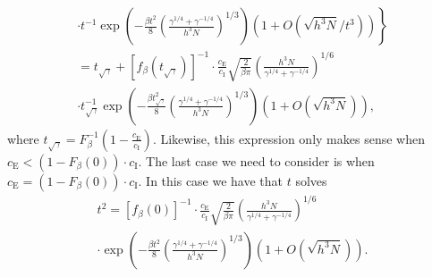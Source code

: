\documentclass[final]{IEEEtran}
\newcommand{\ce}{c_\text{E}}
\newcommand{\ci}{c_\text{I}}
\begin{document}
\begin{IEEEproof}
\begin{multline*}
    \cdot
    \left . t^{-1}
           \exp \!
           \left(
               -\frac{\beta t^2}{8}
               \left(
                   \frac{\gamma^{1/4} + \gamma^{-1/4}}{ h^3 N }
               \right)^{\!1/3}
           \right) \!
           \left(
               1 + O\left(\sqrt{h^3 N}/t^3 \right)
           \right) \!
       \right\}
    \\ \!\!\!
    = t_{\sqrt{\gamma}}
       +
       \left[
           f_\beta \left( t_{\sqrt{\gamma}} \right)
       \right]^{-1}
       \cdot
       \frac{\ce}{\ci}
       \sqrt{\frac{2}{\beta \pi}}
       \left(
           \frac{ h^3 N }{\gamma^{1/4} + \gamma^{-1/4}}
       \right)^{1/6}
    \\
    \cdot t_{\sqrt{\gamma}}^{-1}
       \exp
       \left(
           -\frac{\beta t_{\sqrt{\gamma}}^2}{8}
           \left(
               \frac{\gamma^{1/4} + \gamma^{-1/4}}{ h^3 N }
           \right)^{1/3}
       \right)
       \left(
           1 + O\left(\sqrt{h^3 N} \right)
       \right) ,
\end{multline*}
where $t_{\sqrt{\gamma}} = F_\beta^{-1} \left( 1 - \frac{\ce}{\ci} \right)$.
Likewise, this expression only makes sense when
$\ce < (1 - F_\beta(0)) \cdot \ci$.  The last case we need to consider is
when $\ce = (1 - F_\beta(0)) \cdot \ci$.  In this case we have that $t$
solves
\begin{multline*}
    t^2
    =
    \left[
           f_\beta ( 0 )
    \right]^{-1}
    \cdot
    \frac{\ce}{\ci}
    \sqrt{\frac{2}{\beta \pi}}
    \left(
        \frac{ h^3 N }{\gamma^{1/4} + \gamma^{-1/4}}
    \right)^{1/6}
    \\
    \cdot   \exp
       \left(
           -\frac{\beta t^2}{8}
           \left(
               \frac{\gamma^{1/4} + \gamma^{-1/4}}{ h^3 N }
           \right)^{1/3}
       \right)
       \left(
           1 + O\left(\sqrt{h^3 N} \right)
       \right).
\end{multline*}
\end{IEEEproof}
\end{document}
